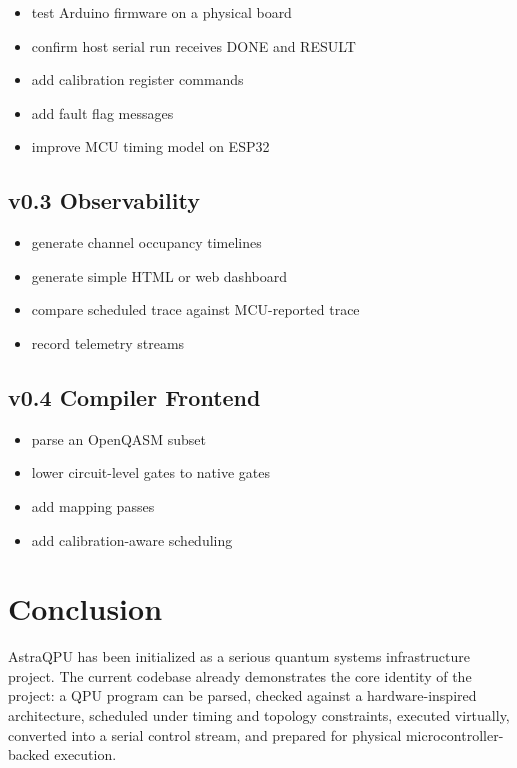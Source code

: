 \documentclass[11pt,a4paper]{article}
\begin{document}
\begin{itemize}[leftmargin=*]
  \item test Arduino firmware on a physical board
  \item confirm host serial run receives DONE and RESULT
  \item add calibration register commands
  \item add fault flag messages
  \item improve MCU timing model on ESP32
\end{itemize}

\subsection{v0.3 Observability}

\begin{itemize}[leftmargin=*]
  \item generate channel occupancy timelines
  \item generate simple HTML or web dashboard
  \item compare scheduled trace against MCU-reported trace
  \item record telemetry streams
\end{itemize}

\subsection{v0.4 Compiler Frontend}

\begin{itemize}[leftmargin=*]
  \item parse an OpenQASM subset
  \item lower circuit-level gates to native gates
  \item add mapping passes
  \item add calibration-aware scheduling
\end{itemize}

\section{Conclusion}

AstraQPU has been initialized as a serious quantum systems infrastructure project. The current codebase already demonstrates the core identity of the project: a QPU program can be parsed, checked against a hardware-inspired architecture, scheduled under timing and topology constraints, executed virtually, converted into a serial control stream, and prepared for physical microcontroller-backed execution.
\end{document}
